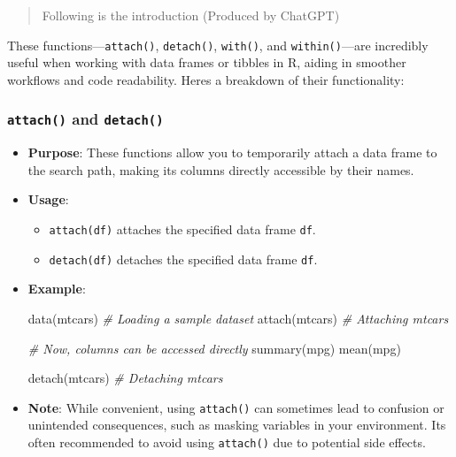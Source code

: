 \documentclass[
]{article}
\newenvironment{Shaded}{}{}
\newcommand{\CommentTok}[1]{\textcolor[rgb]{0.38,0.63,0.69}{\textit{#1}}}
\newcommand{\FunctionTok}[1]{\textcolor[rgb]{0.02,0.16,0.49}{#1}}
\newcommand{\NormalTok}[1]{#1}
\begin{document}
\begin{quote}
Following is the introduction (Produced by ChatGPT)
\end{quote}

These functions---\texttt{attach()}, \texttt{detach()}, \texttt{with()},
and \texttt{within()}---are incredibly useful when working with data
frames or tibbles in R, aiding in smoother workflows and code
readability. Here\textquotesingle s a breakdown of their functionality:

\hypertarget{attach-and-detach}{%
\subsubsection{\texorpdfstring{\texttt{attach()} and
\texttt{detach()}}{attach() and detach()}}\label{attach-and-detach}}

\begin{itemize}
\item
  \textbf{Purpose}: These functions allow you to temporarily attach a
  data frame to the search path, making its columns directly accessible
  by their names.
\item
  \textbf{Usage}:

  \begin{itemize}
  \item
    \texttt{attach(df)} attaches the specified data frame \texttt{df}.
  \item
    \texttt{detach(df)} detaches the specified data frame \texttt{df}.
  \end{itemize}
\item
  \textbf{Example}:

\begin{Shaded}
\begin{Highlighting}[]
\FunctionTok{data}\NormalTok{(mtcars) }\CommentTok{\# Loading a sample dataset}
\FunctionTok{attach}\NormalTok{(mtcars) }\CommentTok{\# Attaching mtcars}

\CommentTok{\# Now, columns can be accessed directly}
\FunctionTok{summary}\NormalTok{(mpg)}
\FunctionTok{mean}\NormalTok{(mpg)}

\FunctionTok{detach}\NormalTok{(mtcars) }\CommentTok{\# Detaching mtcars}
\end{Highlighting}
\end{Shaded}
\item
  \textbf{Note}: While convenient, using \texttt{attach()} can sometimes
  lead to confusion or unintended consequences, such as masking
  variables in your environment. It\textquotesingle s often recommended
  to avoid using \texttt{attach()} due to potential side effects.
\end{itemize}
\end{document}
